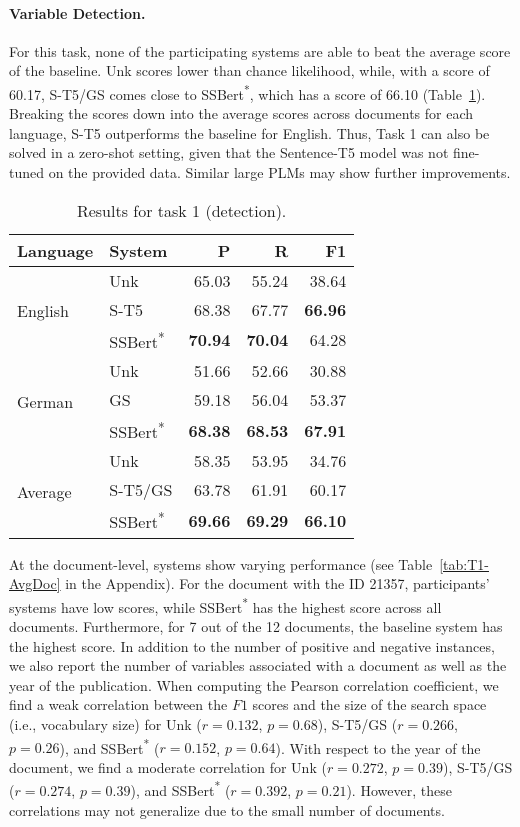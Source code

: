 \documentclass[11pt]{article}
\begin{document}
\paragraph{Variable Detection.} 
For this task, none of the participating systems are able to beat the average score of the baseline.
Unk scores lower than chance likelihood, while, with a score of 60.17, S-T5/GS comes close to SSBert\textsuperscript{*}, which has a score of 66.10 (Table~\ref{tab:T1-Avg}).
Breaking the scores down into the average scores across documents for each language, S-T5 outperforms the baseline for English.
Thus, Task 1 can also be solved in a zero-shot setting, given that the Sentence-T5 model was not fine-tuned on the provided data.
Similar large PLMs may show further improvements.

\begin{table}[]
    \centering
    \begin{tabular}{l|l|r|r|r}
    Language &  System &    P &     R &     F1\\ \hline
    \hline
      \multirow{3}{0.5em}{English} &    Unk &  65.03 &  55.24 &  38.64 \\&    S-T5 &  68.38 &  67.77 &  \textbf{66.96} \\&   SSBert\textsuperscript{*} &  \textbf{70.94} &  \textbf{70.04} &  64.28 \\\hline
      \multirow{3}{0.5em}{German} &    Unk &  51.66 &  52.66 &  30.88 \\&    GS &  59.18 &  56.04 &  53.37 \\&    SSBert\textsuperscript{*} &  \textbf{68.38} &  \textbf{68.53} &  \textbf{67.91} \\\hline
    \multirow{3}{0.5em}{Average} &    Unk &  58.35 &  53.95 &  34.76 \\&    S-T5/GS &  63.78 &  61.91 &  60.17 \\&    SSBert\textsuperscript{*} &  \textbf{69.66} &  \textbf{69.29} &  \textbf{66.10} \\\hline
    \end{tabular}
    \caption{Results for task 1 (detection).}
    \label{tab:T1-Avg}
\end{table}

At the document-level, systems show varying performance (see Table~\ref{tab:T1-AvgDoc} in the Appendix).
For the document with the ID 21357, participants' systems have low scores, while SSBert\textsuperscript{*} has the highest score across all documents.
Furthermore, for 7 out of the 12 documents, the baseline system has the highest score.
In addition to the number of positive and negative instances, we also report the number of variables associated with a document as well as the year of the publication.
When computing the Pearson correlation coefficient, we find a weak correlation between the $F1$ scores and the size of the search space (i.e., vocabulary size) for Unk ($r=0.132$, $p=0.68$), S-T5/GS ($r=0.266$, $p=0.26$), and SSBert\textsuperscript{*} ($r=0.152$, $p=0.64$).
With respect to the year of the document, we find a moderate correlation for Unk ($r=0.272$, $p=0.39$), S-T5/GS ($r=0.274$, $p=0.39$), and SSBert\textsuperscript{*} ($r=0.392$, $p=0.21$).
However, these correlations may not generalize due to the small number of documents.
\end{document}
